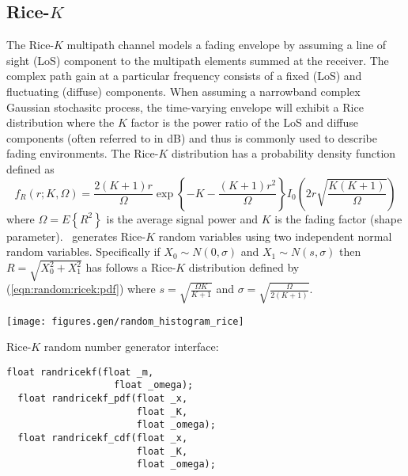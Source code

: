 %
%
\subsection{Rice-$K$}
\label{module:random:ricek}
The Rice-$K$ multipath
channel models a fading envelope by assuming a line of sight (LoS)
component to the multipath elements summed at the receiver.
The complex path gain at a particular frequency consists of a fixed
(LoS) and fluctuating (diffuse) components.
When assuming a narrowband complex Gaussian stochasitc process, the
time-varying envelope will exhibit a Rice distribution where the $K$
factor is the power ratio of the LoS and diffuse components (often
referred to in dB) and thus is commonly used to describe fading
environments.
%
The Rice-$K$ distribution has a probability density function defined as
%
\begin{equation}
\label{eqn:random:ricek:pdf}
    f_R(r;K,\Omega) = 
        \frac{2(K+1)r}{\Omega}
        \exp\left\{-K-\frac{(K+1)r^2}{\Omega}\right\}
        I_0\left( 2r\sqrt{\frac{K(K+1)}{\Omega}} \right)
\end{equation}
%
where $\Omega=E\left\{R^2\right\}$ is the average signal power and $K$
is the fading factor (shape parameter).
\liquid\ generates Rice-$K$ random variables using two independent
normal random variables.
Specifically if
$X_0 \sim N(0,\sigma)$
and
$X_1 \sim N(s,\sigma)$
then
$R = \sqrt{X_0^2 + X_1^2}$
has follows a Rice-$K$ distribution defined by
(\ref{eqn:random:ricek:pdf})
where
$s      = \sqrt{\frac{\Omega K}{K+1}}$
and
$\sigma = \sqrt{\frac{\Omega}{2(K+1)}}$.


\begin{minipage}{0.5\textwidth}
  \texttt{[image: figures.gen/random\_histogram\_rice]}
\end{minipage}
\begin{minipage}{0.5\textwidth}
  Rice-$K$ random number generator interface:
  \begin{Verbatim}[fontsize=\small]
  float randricekf(float _m,
                   float _omega);
  float randricekf_pdf(float _x,
                       float _K,
                       float _omega);
  float randricekf_cdf(float _x,
                       float _K,
                       float _omega);
  \end{Verbatim}
\end{minipage}


% 
%
